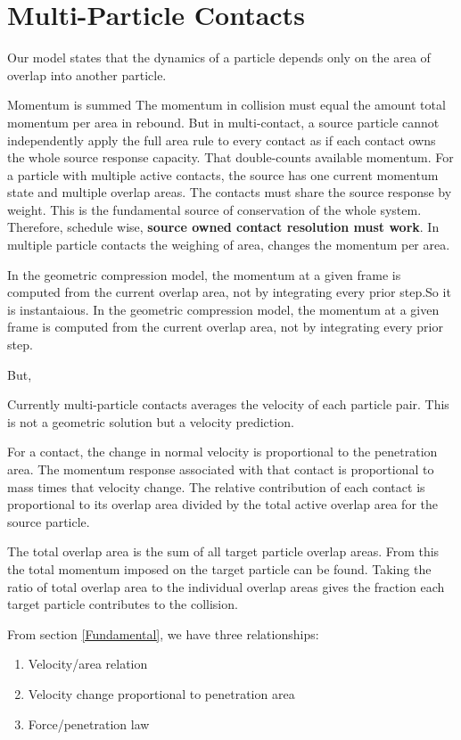 \section{Multi-Particle Contacts}

Our model states that the dynamics of a particle depends only on the area of overlap into another particle. 


Momentum is summed The momentum in collision must equal the amount total momentum per area in rebound. But in multi-contact, a source particle cannot independently apply the full area rule to every contact as if each contact owns the whole source response capacity. That double-counts available momentum. For a particle with multiple active contacts, the source has one current momentum state and multiple overlap areas. The contacts must share the source response by weight.  This is the fundamental source of conservation of the whole system. Therefore, schedule wise, \textbf{source owned contact resolution must work}. In multiple particle contacts the weighing of area, changes the momentum per area.

In the geometric compression model, the momentum at a given frame is computed from the current overlap area, not by integrating every prior step.So it is instantaious. In the geometric compression model, the momentum at a given frame is computed from the current overlap area, not by integrating every prior step.
 

But, 

Currently multi-particle contacts averages the velocity of each particle pair.    
This is not a geometric solution but a velocity prediction. 

For a contact, the change in normal velocity is proportional to the penetration area. 
The momentum response associated with that contact is proportional to mass times that velocity change.
The relative contribution of each contact is proportional to its overlap area divided by the total active overlap area for the source particle.

The total overlap area is the sum of all target particle
overlap areas. From this the total momentum imposed on the target particle can be found.
Taking the ratio of total overlap area to the individual overlap areas gives the fraction
each target particle contributes to the collision.

From section \ref{Fundamental}, we have three relationships:
\begin{enumerate}
\item Velocity/area relation
\item Velocity change proportional to penetration area
\item Force/penetration law
\end{enumerate}

